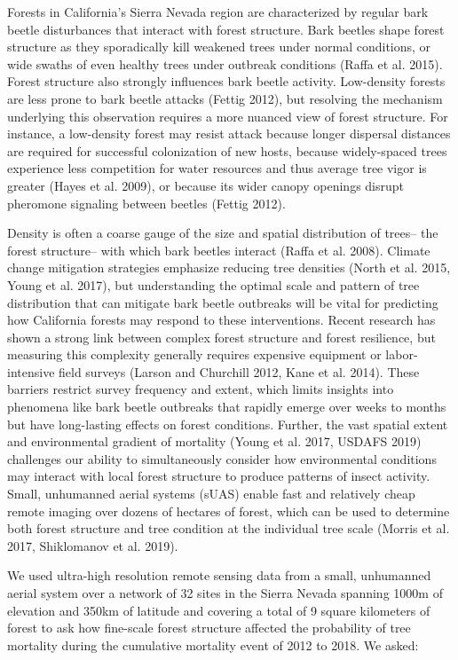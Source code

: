 \documentclass[]{article}
\begin{document}
Forests in California's Sierra Nevada region are characterized by
regular bark beetle disturbances that interact with forest structure.
Bark beetles shape forest structure as they sporadically kill weakened
trees under normal conditions, or wide swaths of even healthy trees
under outbreak conditions (Raffa et al. 2015). Forest structure also
strongly influences bark beetle activity. Low-density forests are less
prone to bark beetle attacks (Fettig 2012), but resolving the mechanism
underlying this observation requires a more nuanced view of forest
structure. For instance, a low-density forest may resist attack because
longer dispersal distances are required for successful colonization of
new hosts, because widely-spaced trees experience less competition for
water resources and thus average tree vigor is greater (Hayes et al.
2009), or because its wider canopy openings disrupt pheromone signaling
between beetles (Fettig 2012).

Density is often a coarse gauge of the size and spatial distribution of
trees-- the forest structure-- with which bark beetles interact (Raffa
et al. 2008). Climate change mitigation strategies emphasize reducing
tree densities (North et al. 2015, Young et al. 2017), but understanding
the optimal scale and pattern of tree distribution that can mitigate
bark beetle outbreaks will be vital for predicting how California
forests may respond to these interventions. Recent research has shown a
strong link between complex forest structure and forest resilience, but
measuring this complexity generally requires expensive equipment or
labor-intensive field surveys (Larson and Churchill 2012, Kane et al.
2014). These barriers restrict survey frequency and extent, which limits
insights into phenomena like bark beetle outbreaks that rapidly emerge
over weeks to months but have long-lasting effects on forest conditions.
Further, the vast spatial extent and environmental gradient of mortality
(Young et al. 2017, USDAFS 2019) challenges our ability to
simultaneously consider how environmental conditions may interact with
local forest structure to produce patterns of insect activity. Small,
unhumanned aerial systems (sUAS) enable fast and relatively cheap remote
imaging over dozens of hectares of forest, which can be used to
determine both forest structure and tree condition at the individual
tree scale (Morris et al. 2017, Shiklomanov et al. 2019).

We used ultra-high resolution remote sensing data from a small,
unhumanned aerial system over a network of 32 sites in the Sierra Nevada
spanning 1000m of elevation and 350km of latitude and covering a total
of 9 square kilometers of forest to ask how fine-scale forest structure
affected the probability of tree mortality during the cumulative
mortality event of 2012 to 2018. We asked:
\end{document}
